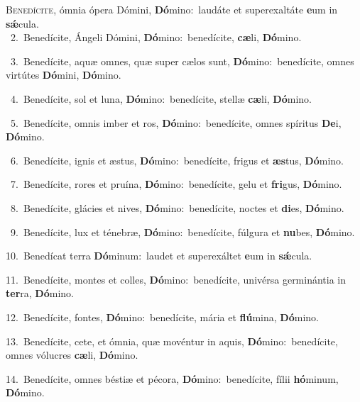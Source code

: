 \lettrine{\initial\textcolor{\initialcolor}{B}}{enedícite,} ómnia ópera Dómini, \textbf{Dó}\-mino:~\star laudáte et superexaltáte \textbf{e}\-um in \textbf{sǽ}\-cula.\\
{\numbfont\textcolor{\numbcolor}{~2.}}~Benedícite, Ángeli Dómini, \textbf{Dó}\-mino:~\star benedícite, \textbf{cæ}\-li, \textbf{Dó}\-mino.\par
{\numbfont\textcolor{\numbcolor}{~3.}}~Benedícite, aquæ omnes, quæ super cælos sunt, \textbf{Dó}\-mino:~\star benedícite, omnes virtútes \textbf{Dó}\-mini, \textbf{Dó}\-mino.\par
{\numbfont\textcolor{\numbcolor}{~4.}}~Benedícite, sol et luna, \textbf{Dó}\-mino:~\star benedícite, stellæ \textbf{cæ}\-li, \textbf{Dó}\-mino.\par
{\numbfont\textcolor{\numbcolor}{~5.}}~Benedícite, omnis imber et ros, \textbf{Dó}\-mino:~\star benedícite, omnes spíritus \textbf{De}\-i, \textbf{Dó}\-mino.\par
{\numbfont\textcolor{\numbcolor}{~6.}}~Benedícite, ignis et æstus, \textbf{Dó}\-mino:~\star benedícite, frigus et \textbf{æs}\-tus, \textbf{Dó}\-mino.\par
{\numbfont\textcolor{\numbcolor}{~7.}}~Benedícite, rores et pruína, \textbf{Dó}\-mino:~\star benedícite, gelu et \textbf{fri}\-gus, \textbf{Dó}\-mino.\par
{\numbfont\textcolor{\numbcolor}{~8.}}~Benedícite, glácies et nives, \textbf{Dó}\-mino:~\star benedícite, noctes et \textbf{di}\-es, \textbf{Dó}\-mino.\par
{\numbfont\textcolor{\numbcolor}{~9.}}~Benedícite, lux et ténebræ, \textbf{Dó}\-mino:~\star benedícite, fúlgura et \textbf{nu}\-bes, \textbf{Dó}\-mino.\par
{\numbfont\textcolor{\numbcolor}{10.}}~Benedícat terra \textbf{Dó}\-minum:~\star laudet et superexáltet \textbf{e}\-um in \textbf{sǽ}\-cula.\par
{\numbfont\textcolor{\numbcolor}{11.}}~Benedícite, montes et colles, \textbf{Dó}\-mino:~\star benedícite, univérsa germinántia in \textbf{ter}\-ra, \textbf{Dó}\-mino.\par
{\numbfont\textcolor{\numbcolor}{12.}}~Benedícite, fontes, \textbf{Dó}\-mino:~\star benedícite, mária et \textbf{flú}\-mina, \textbf{Dó}\-mino.\par
{\numbfont\textcolor{\numbcolor}{13.}}~Benedícite, cete, et ómnia, quæ movéntur in aquis, \textbf{Dó}\-mino:~\star benedícite, omnes vólucres \textbf{cæ}\-li, \textbf{Dó}\-mino.\par
{\numbfont\textcolor{\numbcolor}{14.}}~Benedícite, omnes béstiæ et pécora, \textbf{Dó}\-mino:~\star benedícite, fílii \textbf{hó}\-minum, \textbf{Dó}\-mino.\par
